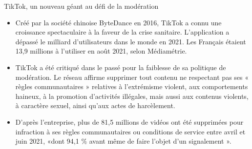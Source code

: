 TikTok, un nouveau géant au défi de la modération
\begin{itemize}
 \item Créé par la société chinoise ByteDance en 2016, TikTok a connu une croissance spectaculaire à la faveur de la crise sanitaire. L’application a dépassé le milliard d’utilisateurs dans le monde en 2021. Les Français étaient 13,9 millions à l’utiliser en août 2021, selon Médiamétrie.

\item TikTok a été critiqué dans le passé pour la faiblesse de sa politique de modération. Le réseau affirme supprimer tout contenu ne respectant pas ses « règles communautaires » relatives à l’extrémisme violent, aux comportements haineux, à la promotion d’activités illégales, mais aussi aux contenus violents, à caractère sexuel, ainsi qu’aux actes de harcèlement.

\item D’après l’entreprise, plus de 81,5 millions de vidéos ont été supprimées pour infraction à ses règles communautaires ou conditions de service entre avril et juin 2021, «dont 94,1 \% avant même de faire l’objet d’un signalement ».
\end{itemize}

